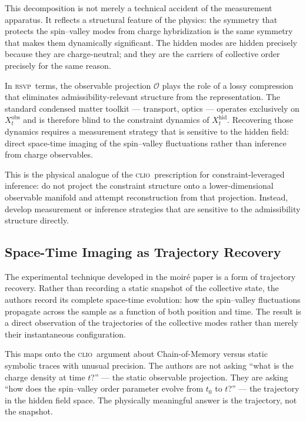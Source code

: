 \documentclass[11pt,a4paper]{article}
\theoremstyle{plain}
\theoremstyle{definition}
\theoremstyle{remark}
\newcommand{\RSVP}{\textup{\textsc{rsvp}}}
\newcommand{\CLIO}{\textup{\textsc{clio}}}
\begin{document}
This decomposition is not merely a technical accident of the measurement
apparatus. It reflects a structural feature of the physics: the symmetry
that protects the spin--valley modes from charge hybridization is the same
symmetry that makes them dynamically significant. The hidden modes are
hidden precisely because they are charge-neutral; and they are the carriers
of collective order precisely for the same reason.

In \RSVP\ terms, the observable projection $\mathcal{O}$ plays the role of
a lossy compression that eliminates admissibility-relevant structure from
the representation. The standard condensed matter toolkit --- transport,
optics --- operates exclusively on $X_t^{\mathrm{obs}}$ and is therefore
blind to the constraint dynamics of $X_t^{\mathrm{hid}}$. Recovering those
dynamics requires a measurement strategy that is sensitive to the hidden
field: direct space-time imaging of the spin--valley fluctuations rather than
inference from charge observables.

This is the physical analogue of the \CLIO\ prescription for
constraint-leveraged inference: do not project the constraint structure
onto a lower-dimensional observable manifold and attempt reconstruction
from that projection. Instead, develop measurement or inference strategies
that are sensitive to the admissibility structure directly.

\subsection{Space-Time Imaging as Trajectory Recovery}

The experimental technique developed in the moiré paper is a form of
trajectory recovery. Rather than recording a static snapshot of the
collective state, the authors record its complete space-time evolution: how
the spin--valley fluctuations propagate across the sample as a function of
both position and time. The result is a direct observation of the
trajectories of the collective modes rather than merely their instantaneous
configuration.

This maps onto the \CLIO\ argument about Chain-of-Memory versus static
symbolic traces with unusual precision. The authors are not asking ``what
is the charge density at time $t$?'' --- the static observable projection.
They are asking ``how does the spin--valley order parameter evolve from
$t_0$ to $t$?'' --- the trajectory in the hidden field space. The
physically meaningful answer is the trajectory, not the snapshot.
\end{document}
